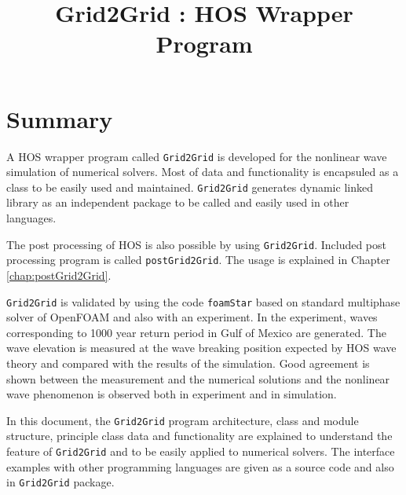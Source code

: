

\title{Grid2Grid : HOS Wrapper Program }



	
	
	

	\tableofcontents	

	
	
	

		    

		    	

		
		
			

		

	
	
	
		
	\pagebreak
	\section{Summary}
	
	
	A HOS wrapper program called \texttt{Grid2Grid} is developed for the nonlinear wave simulation of numerical solvers. Most of data and functionality is encapsuled as a class to be easily used and maintained. \texttt{Grid2Grid} generates dynamic linked library as an independent package to be called and easily used in other languages. 
	
	The post processing of HOS is also possible by using \texttt{Grid2Grid}. Included post processing program is called \texttt{postGrid2Grid}. The usage is explained in Chapter \ref{chap:postGrid2Grid}.
	
	\texttt{Grid2Grid} is validated by using the code \texttt{foamStar} based on standard multiphase solver of OpenFOAM and also with an experiment. In the experiment, waves corresponding to 1000 year return period in Gulf of Mexico are generated. The wave elevation is measured at the wave breaking position expected by HOS wave theory and compared with the results of the simulation. Good agreement is shown between the measurement and the numerical solutions and the nonlinear wave phenomenon is observed both in experiment and in simulation. 
	
	In this document, the \texttt{Grid2Grid} program architecture, class and module structure, principle class data and functionality are explained to understand the feature of \texttt{Grid2Grid} and to be easily applied to numerical solvers. The interface examples with other programming languages are given as a source code and also in \texttt{Grid2Grid} package. 	
	

	\pagebreak
	

	


